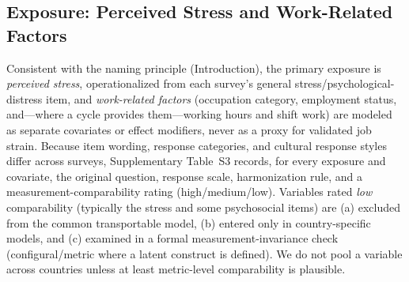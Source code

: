 \subsection{Exposure: Perceived Stress and Work-Related Factors}
Consistent with the naming principle (Introduction), the primary exposure is \emph{perceived stress}, operationalized from each survey's general stress/psychological-distress item, and \emph{work-related factors} (occupation category, employment status, and---where a cycle provides them---working hours and shift work) are modeled as separate covariates or effect modifiers, never as a proxy for validated job strain. Because item wording, response categories, and cultural response styles differ across surveys, Supplementary Table~S3 records, for every exposure and covariate, the original question, response scale, harmonization rule, and a measurement-comparability rating (high/medium/low). Variables rated \emph{low} comparability (typically the stress and some psychosocial items) are (a) excluded from the common transportable model, (b) entered only in country-specific models, and (c) examined in a formal measurement-invariance check (configural/metric where a latent construct is defined). We do not pool a variable across countries unless at least metric-level comparability is plausible.


